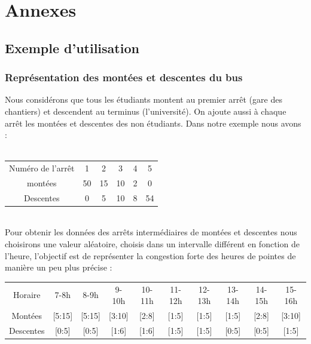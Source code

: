 \documentclass[a4paper,11pt]{article}
\begin{document}
\newpage
\section{Annexes}
	\subsection{Exemple d'utilisation}
		\subsubsection{Représentation des montées et descentes du bus}
			Nous considérons que tous les étudiants montent au premier arrêt (gare des chantiers) et descendent au terminus (l'université). On ajoute aussi à chaque arrêt les montées et descentes des non étudiants. Dans notre exemple nous avons : \\
			\\
			\begin{tabular}{ | c | c | c | c | c | c |}
 				\hline			
   				Numéro de l'arrêt	& 1 	& 2 	& 3 	& 4 	& 5\\
   				montées				& 50 	& 15 	& 10 	& 2 	& 0\\
   				Descentes			& 0 	& 5 	& 10 	& 8 	& 54\\
 				\hline  
 			\end{tabular}\\
 			Pour obtenir les données des arrêts intermédiaires de montées et descentes nous choisirons une valeur aléatoire, choisis dans un intervalle différent en fonction de l'heure, l'objectif est de représenter la congestion forte des heures de pointes de manière un peu plus précise : \\
 			\begin{tabular}{ | c | c | c | c | c | c | c | c | c | c |}
 				\hline			
   				Horaire & 7-8h & 8-9h & 9-10h & 10-11h & 11-12h & 12-13h & 13-14h & 14-15h & 15-16h\\
   				Montées & [5:15] & [5:15] & [3:10] & [2:8] & [1:5] & [1:5] & [1:5] & [2:8] & [3:10]\\
   				Descentes & [0:5] & [0:5] & [1:6] & [1:6] & [1:5] & [1:5] & [0:5] & [0:5] & [1:5]\\
 				\hline  
 			\end{tabular}\\
\end{document}
